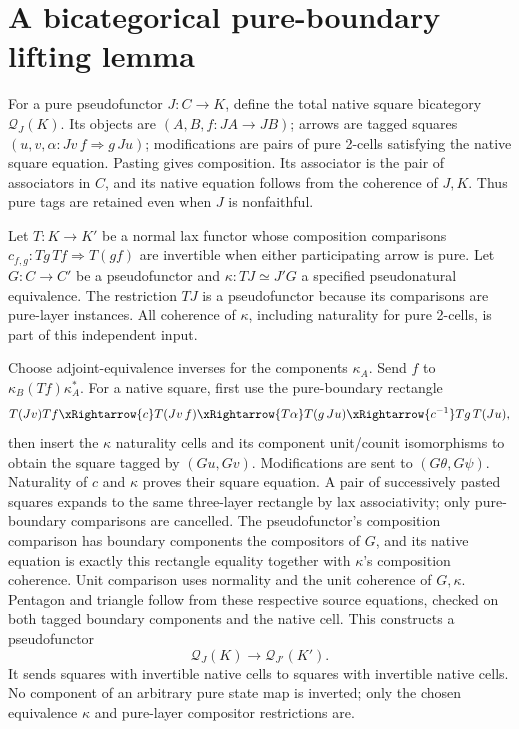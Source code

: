 \documentclass{article}
\begin{document}
\section{A bicategorical pure-boundary lifting lemma}
For a pure pseudofunctor $J:C\to K$, define the total native square bicategory $\mathcal Q_J(K)$. Its objects are $(A,B,f:JA\to JB)$; arrows are tagged squares $(u,v,\alpha:Jv\,f\Rightarrow g\,Ju)$; modifications are pairs of pure 2-cells satisfying the native square equation. Pasting gives composition. Its associator is the pair of associators in $C$, and its native equation follows from the coherence of $J,K$. Thus pure tags are retained even when $J$ is nonfaithful.

Let $T:K\to K'$ be a normal lax functor whose composition comparisons $c_{f,g}:Tg\,Tf\Rightarrow T(gf)$ are invertible when either participating arrow is pure. Let $G:C\to C'$ be a pseudofunctor and $\kappa:TJ\simeq J'G$ a specified pseudonatural equivalence. The restriction $TJ$ is a pseudofunctor because its comparisons are pure-layer instances. All coherence of $\kappa$, including naturality for pure 2-cells, is part of this independent input.

Choose adjoint-equivalence inverses for the components $\kappa_A$. Send $f$ to $\kappa_B(Tf)\kappa_A^*$. For a native square, first use the pure-boundary rectangle
\[
T(Jv)Tf\xRightarrow{c}T(Jv\,f)
\xRightarrow{T\alpha}T(g\,Ju)
\xRightarrow{c^{-1}}Tg\,T(Ju),
\]
then insert the $\kappa$ naturality cells and its component unit/counit isomorphisms to obtain the square tagged by $(Gu,Gv)$. Modifications are sent to $(G\theta,G\psi)$. Naturality of $c$ and $\kappa$ proves their square equation. A pair of successively pasted squares expands to the same three-layer rectangle by lax associativity; only pure-boundary comparisons are cancelled. The pseudofunctor's composition comparison has boundary components the compositors of $G$, and its native equation is exactly this rectangle equality together with $\kappa$'s composition coherence. Unit comparison uses normality and the unit coherence of $G,\kappa$. Pentagon and triangle follow from these respective source equations, checked on both tagged boundary components and the native cell. This constructs a pseudofunctor
\[
\mathcal Q_J(K)\longrightarrow\mathcal Q_{J'}(K').
\]
It sends squares with invertible native cells to squares with invertible native cells. No component of an arbitrary pure state map is inverted; only the chosen equivalence $\kappa$ and pure-layer compositor restrictions are.
\end{document}
